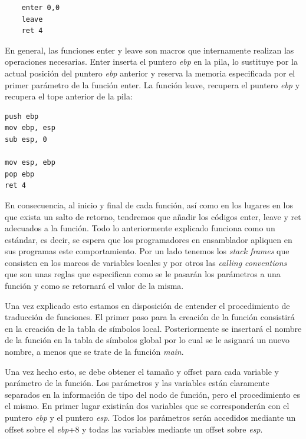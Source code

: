 \documentclass[a4paper,10pt]{article}
\begin{document}
\begin{lstlisting}
	enter 0,0
	leave
	ret 4
\end{lstlisting}
En general, las funciones enter y leave son macros que internamente realizan las operaciones necesarias. Enter inserta el puntero \textit{ebp} en la pila, lo sustituye por la actual posición del puntero \textit{ebp} anterior y reserva la memoria especificada por el primer parámetro de la función enter. La función leave, recupera el puntero \textit{ebp} y recupera el tope anterior de la pila:
\begin{lstlisting}
push ebp
mov ebp, esp
sub esp, 0

mov esp, ebp
pop ebp
ret 4 
\end{lstlisting}

En consecuencia, al inicio y final de cada función, así como en los lugares en los que exista un salto de retorno, tendremos que añadir los códigos enter, leave y ret adecuados a la función. Todo lo anteriormente explicado funciona como un estándar, es decir, se espera que los programadores en ensamblador apliquen en sus programas este comportamiento. Por un lado tenemos los \emph{stack frames} que consisten en los marcos de variables locales y por otros las \emph{calling conventions} que son unas reglas que especifican como se le pasarán los parámetros a una función y como se retornará el valor de la misma.

Una vez explicado esto estamos en disposición de entender el procedimiento de traducción de funciones. El primer paso para la creación de la función consistirá en la creación de la tabla de símbolos local. Posteriormente se insertará el nombre de la función en la tabla de símbolos global por lo cual se le asignará un nuevo nombre, a menos que se trate de la función \textit{main}. 

Una vez hecho esto, se debe obtener el tamaño y offset para cada variable y parámetro de la función. Los parámetros y las variables están claramente separados en la información de tipo del nodo de función, pero el procedimiento es el mismo. En primer lugar existirán dos variables que se corresponderán con el puntero \textit{ebp} y el puntero \textit{esp}. Todos los parámetros serán accedidos mediante un offset sobre el \textit{ebp}+8 y todas las variables mediante un offset sobre \textit{esp}.
\end{document}
